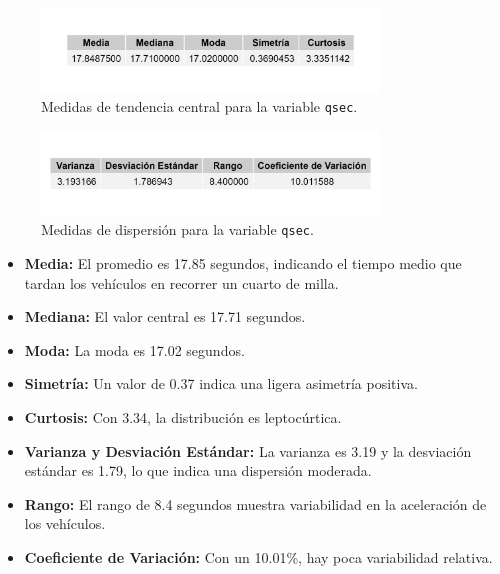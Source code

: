 \documentclass{article}
\begin{document}
\begin{enumerate}
	      \begin{figure}[H]
		      \centering
		      \includegraphics[width=0.8\textwidth]{MTC/qsec_central.png}
		      \caption{Medidas de tendencia central para la variable \texttt{qsec}.}
		      \label{fig:qsec_central}
	      \end{figure}

	      \begin{figure}[H]
		      \centering
		      \includegraphics[width=0.8\textwidth]{MTC/qsec_dispersion.png}
		      \caption{Medidas de dispersión para la variable \texttt{qsec}.}
		      \label{fig:qsec_dispersion}
	      \end{figure}

	     
	      \begin{itemize}
		      \item \textbf{Media:} El promedio es 17.85 segundos, indicando el tiempo medio que tardan los vehículos en recorrer un cuarto de milla.
		      \item \textbf{Mediana:} El valor central es 17.71 segundos.
		      \item \textbf{Moda:} La moda es 17.02 segundos.
		      \item \textbf{Simetría:} Un valor de 0.37 indica una ligera asimetría positiva.
		      \item \textbf{Curtosis:} Con 3.34, la distribución es leptocúrtica.
		      \item \textbf{Varianza y Desviación Estándar:} La varianza es 3.19 y la desviación estándar es 1.79, lo que indica una dispersión moderada.
		      \item \textbf{Rango:} El rango de 8.4 segundos muestra variabilidad en la aceleración de los vehículos.
		      \item \textbf{Coeficiente de Variación:} Con un 10.01\%, hay poca variabilidad relativa.
	      \end{itemize}


\end{enumerate}
\end{document}
